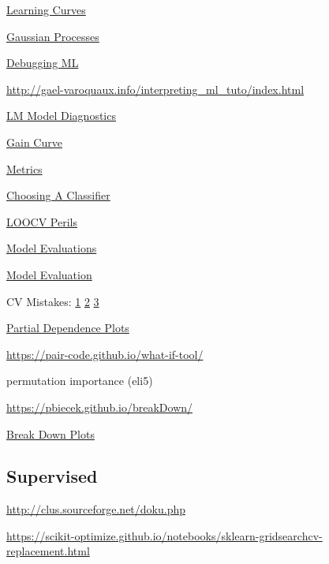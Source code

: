 \documentclass[]{book}
\begin{document}
\href{http://www.ritchieng.com/machinelearning-learning-curve/}{Learning
Curves}

\href{http://scikit-learn.org/stable/modules/gaussian_process.html}{Gaussian
Processes}

\href{http://nlpers.blogspot.com/2016/08/debugging-machine-learning.html}{Debugging
ML}

\url{http://gael-varoquaux.info/interpreting_ml_tuto/index.html}

\href{http://mpastell.com/2013/04/19/python_regression/}{LM Model
Diagnostics}

\href{https://www.rdocumentation.org/packages/WVPlots/versions/0.2.6/topics/GainCurvePlot}{Gain
Curve}

\href{https://www.analyticsvidhya.com/blog/2016/02/7-important-model-evaluation-error-metrics/}{Metrics}

\href{http://blog.echen.me/2011/04/27/choosing-a-machine-learning-classifier/}{Choosing
A Classifier}

\href{http://www.russpoldrack.org/2012/12/the-perils-of-leave-one-out.html}{LOOCV
Perils}

\href{http://www.win-vector.com/blog/2016/12/be-careful-evaluating-model-predictions/}{Model
Evaluations}

\href{http://blog.dato.com/how-to-evaluate-machine-learning-models-part-1-orientation}{Model
Evaluation}

CV Mistakes:
\href{http://betatim.github.io/posts/cross-validation-gone-wrong/}{1}
\textbar{}
\href{http://www.alfredo.motta.name/cross-validation-done-wrong/}{2}
\textbar{} \href{http://robjhyndman.com/hyndsight/crossvalidation/}{3}

\href{https://cran.r-project.org/web/packages/pdp/pdp.pdf}{Partial
Dependence Plots}

\url{https://pair-code.github.io/what-if-tool/}

permutation importance (eli5)

\url{https://pbiecek.github.io/breakDown/}

\href{https://cran.r-project.org/web/packages/breakDown/index.html}{Break
Down Plots}

\subsection{Supervised}\label{supervised-1}

\url{http://clus.sourceforge.net/doku.php}

\url{https://scikit-optimize.github.io/notebooks/sklearn-gridsearchcv-replacement.html}
\end{document}
